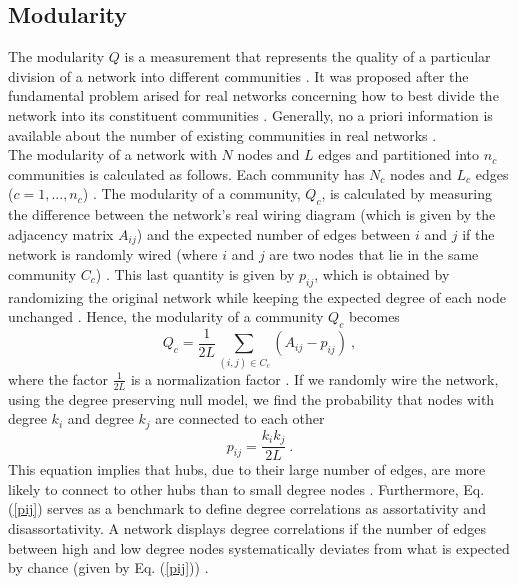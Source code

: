 \documentclass[11 pt , letterpaper , twoside , openright]{book}
\begin{document}
\subsection{Modularity}

The modularity $Q$ is a measurement that represents the quality of a particular division of a network into different communities \cite{F.Costa2007}. It was proposed after the fundamental problem arised for real networks concerning how to best divide the network into its constituent communities \cite{F.Costa2007}. Generally, no a priori information is available about the number of existing communities in real networks \cite{F.Costa2007}.\\
\newline
The modularity of a network with $N$ nodes and $L$ edges and partitioned into $n_c$ communities is calculated as follows. Each community has $N_c$ nodes and $L_c$ edges ($c = 1,..., n_c$) \cite{Albert2016}. The modularity of a community, $Q_c$, is calculated by measuring the difference between the network's real wiring diagram (which is given by the adjacency matrix $A_{ij}$) and the expected number of edges between $i$ and $j$ if the network is randomly wired (where $i$ and $j$ are two nodes that lie in the same community $C_c$) \cite{Albert2016}. This last quantity is given by $p_{ij}$, which is obtained by randomizing the original network while keeping the expected degree of each node unchanged \cite{Albert2016}. Hence, the modularity of a community $Q_c$ becomes
\begin{equation}
	Q_c = \frac{1}{2L}\sum_{(i,j) \in C_c} (A_{ij} - p_{ij}) \ ,
\end{equation}
where the factor $\frac{1}{2L}$ is a normalization factor \cite{Albert2016}. If we randomly wire the network, using the degree preserving null model, we find the probability that nodes with degree $k_i$ and degree $k_j$ are connected to each other \cite{Bara2016}
\begin{equation}\label{pij}
	p_{ij} = \frac{k_ik_j}{2L} \ .
\end{equation}
This equation implies that hubs, due to their large number of edges, are more likely to connect to other hubs than to small degree nodes \cite{Bara2016}. Furthermore, Eq. (\ref{pij}) serves as a benchmark to define degree correlations as assortativity and disassortativity. A network displays degree correlations if the number of edges between high and low degree nodes systematically deviates from what is expected by chance (given by Eq. (\ref{pij})) \cite{Bara2016}. \\
\end{document}
